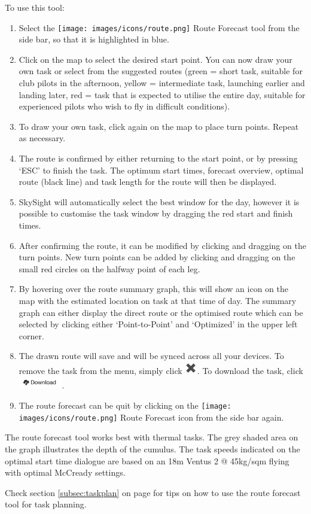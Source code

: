 \documentclass[11pt,a4paper]{article}
\begin{document}
To use this tool:
\begin{enumerate}
\item Select the \texttt{[image: images/icons/route.png]} Route Forecast tool from the side bar, so that it is highlighted in blue.
\item Click on the map to select the desired start point. You can now draw your own task or select from the suggested routes (green = short task, suitable for club pilots in the afternoon, yellow = intermediate task, launching earlier and landing later, red = task that is expected to utilise the entire day, suitable for experienced pilots who wish to fly in difficult conditions).
\item To draw your own task, click again on the map to place turn points. Repeat as necessary.
\item The route is confirmed by either returning to the start point, or by pressing `ESC' to finish the task. The optimum start times, forecast overview, optimal route (black line) and task length for the route will then be displayed.
\item SkySight will automatically select the best window for the day, however it is possible to customise the task window by dragging the red start and finish times.
\item After confirming the route, it can be modified by clicking and dragging on the turn points. New turn points can be added by clicking and dragging on the small red circles on the halfway point of each leg.
\item By hovering over the route summary graph, this will show an icon on the map with the estimated location on task at that time of day. The summary graph can either display the direct route or the optimised route which can be selected by clicking either `Point-to-Point' and `Optimized' in the upper left corner.
\item The drawn route will save and will be synced across all your devices. To remove the task from the menu, simply click \includegraphics[height=15pt]{images/icons/x.png}. To download the task, click \includegraphics[height=15pt]{images/icons/download.png}. 
\item The route forecast can be quit by clicking on the \texttt{[image: images/icons/route.png]} Route Forecast icon from the side bar again.
\end{enumerate}
The route forecast tool works best with thermal tasks. The grey shaded area on the graph illustrates the depth of the cumulus. The task speeds indicated on the optimal start time dialogue are based on an 18m Ventus 2 @ 45kg/sqm flying with optimal McCready settings. 
\begin{tip}
\item Check section \ref{subsec:taskplan} on page \pageref{subsec:taskplan} for tips on how to use the route forecast tool for task planning.
\end{tip}
\end{document}
